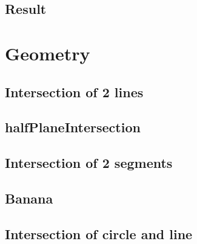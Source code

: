 \documentclass[a4paper,10pt,twocolumn,oneside]{article}
\begin{document}
\subsection{Result}


\section{Geometry}

% 

\subsection{Intersection of 2 lines}


\subsection{halfPlaneIntersection}


% 

\subsection{Intersection of 2 segments}


\subsection{Banana}


% 

\subsection{Intersection of circle and line}

\end{document}
